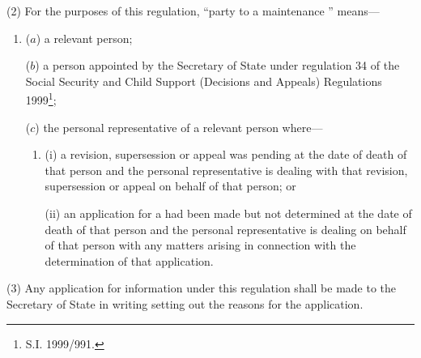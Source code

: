 \documentclass[a4paper,12pt]{article}
\begin{document}
(2) For the purposes of this regulation, “party to a maintenance ” means—
\begin{enumerate}\item[]
($a$) a relevant person;

($b$) a person appointed by the Secretary of State under regulation 
34 of the Social Security and Child Support (Decisions and Appeals) Regulations 1999\footnote{\frenchspacing S.I. 1999/991.};  %


($c$) the personal representative of a relevant person where—
\begin{enumerate}\item[]
(i) a 
revision, supersession  %
or appeal was pending at the date of death of that person and the personal representative is dealing with that 
revision, supersession  %
or appeal on behalf of that person; or

(ii) an application for a 
had been made but not determined at the date of death of that person and the personal representative is dealing 
on behalf of that person with any matters arising in connection with the determination of that application.  %
\end{enumerate}
\end{enumerate}

(3) Any application for information under this regulation shall be made to the Secretary of State 
in writing setting out the reasons for the application.
\end{document}
